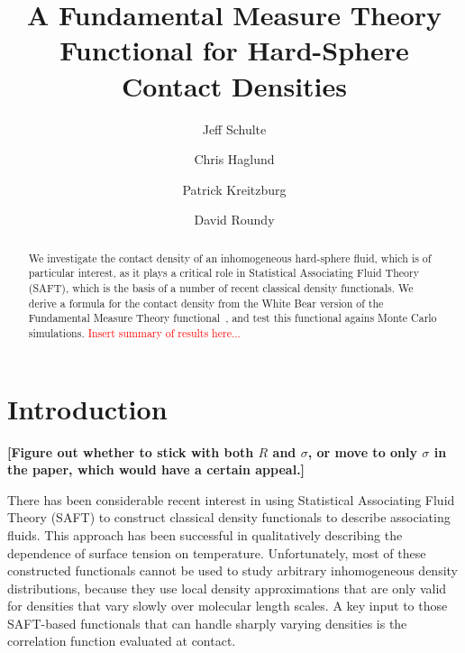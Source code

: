 \documentclass[letterpaper,twocolumn,amsmath,amssymb,jcp,10pt,aip]{revtex4-1}
\newcommand{\red}[1]{{\bf \color{red} #1}}
\newcommand{\fixme}[1]{\red{[#1]}}
\begin{document}
\title{A Fundamental Measure Theory Functional for Hard-Sphere Contact Densities}

\author{Jeff Schulte}
\author{Chris Haglund}
\author{Patrick Kreitzburg}
\author{David Roundy}


\begin{abstract}
  We investigate the contact density of an inhomogeneous hard-sphere
  fluid, which is of particular interest, as it plays a critical role
  in Statistical Associating Fluid Theory (SAFT), which is the basis
  of a number of recent classical density functionals.  We derive a
  formula for the contact density from the White Bear version of the
  Fundamental Measure Theory functional~\cite{roth2002whitebear}, and
  test this functional agains Monte Carlo simulations.
  \textcolor{red}{Insert summary of results here...}
\end{abstract}

\maketitle

\section{Introduction}

\fixme{Figure out whether to stick with both $R$ and $\sigma$, or move
to only $\sigma$ in the paper, which would have a certain appeal.}

\newcommand\saftlocaldft{felipe2001examination, gloor2002saft,%
  gloor2004accurate, clark2006developing, gloor2007prediction,%
  kahl2008modified, gross2009density}
\newcommand\saftnonlocaldft{yu2002fmt-dft-inhomogeneous-associating,%
  fu2005vapor-liquid-dft,bryk2006density}

There has been considerable recent interest in using Statistical
Associating Fluid Theory (SAFT) to construct classical density
functionals to describe associating
fluids\cite{\saftlocaldft,\saftnonlocaldft}.  This approach has been
successful in qualitatively describing the dependence of surface
tension on temperature.  Unfortunately, most of these constructed
functionals\cite{\saftlocaldft} cannot be used to study arbitrary
inhomogeneous density distributions, because they use local density
approximations that are only valid for densities that vary slowly over
molecular length scales.  A key input to those SAFT-based functionals
that can handle sharply varying densities is the correlation function
evaluated at contact.
\end{document}
